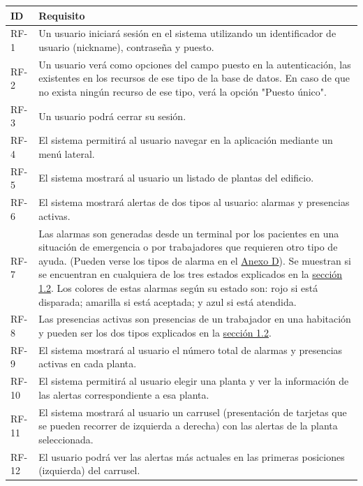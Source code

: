 \begin{longtable}{|p{1cm}|p{14cm}|}
	\hline
	\textbf{ID} & \textbf{Requisito} \\
	\hline
	RF-1 	& 	Un usuario iniciará sesión en el sistema utilizando un identificador de usuario (nickname), contraseña y puesto. \\
	\hline
	RF-2	&	Un usuario verá como opciones del campo puesto en la autenticación, las existentes en los recursos de ese tipo de la base de datos. En caso de que no exista ningún recurso de ese tipo, verá la opción "Puesto único".	\\
	\hline
	RF-3	&	Un usuario podrá cerrar su sesión.	\\
	\hline
	RF-4	&	El sistema permitirá al usuario navegar en la aplicación mediante un menú lateral. \\
	\hline
	RF-5	&	El sistema mostrará al usuario un listado de plantas del edificio. \\
	\hline
	RF-6	&	El sistema mostrará alertas de dos tipos al usuario: alarmas y presencias activas. \\
	\hline
	RF-7	&	Las alarmas son generadas desde un terminal por los pacientes en una situación de emergencia o por trabajadores que requieren otro tipo de ayuda. (Pueden verse los tipos de alarma en el \hyperref[anexo-d]{Anexo D}). Se muestran si se encuentran en cualquiera de los tres estados explicados en la \hyperref[section-objetivos]{sección 1.2}. Los colores de estas alarmas según su estado son: rojo si está disparada; amarilla si está aceptada; y azul si está atendida. \\
	\hline
	RF-8	&	Las presencias activas son presencias de un trabajador en una habitación y pueden ser los dos tipos explicados en la \hyperref[section-objetivos]{sección 1.2}. \\
	\hline
	RF-9	&	El sistema mostrará al usuario el número total de alarmas y presencias activas en cada planta. \\
	\hline
	RF-10	&	El sistema permitirá al usuario elegir una planta y ver la información de las alertas correspondiente a esa planta. \\
	\hline
	RF-11	&	El sistema mostrará al usuario un carrusel (presentación de tarjetas que se pueden recorrer de izquierda a derecha) con las alertas de la planta seleccionada. \\
	\hline
	RF-12	&	El usuario podrá ver las alertas más actuales en las primeras posiciones (izquierda) del carrusel. \\

\end{longtable}
